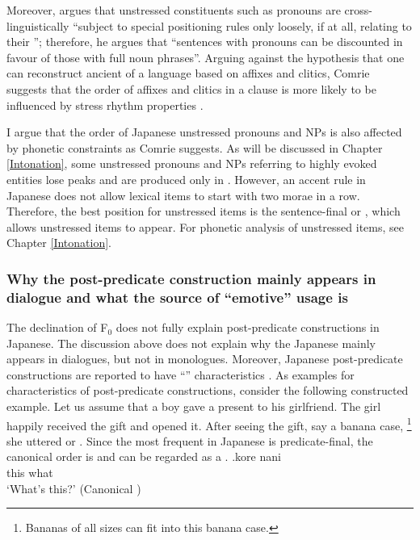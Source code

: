 Moreover,  argues that unstressed constituents such as  pronouns are cross-linguistically ``subject to special positioning rules only loosely, if at all, relating to their '';
therefore, he argues that ``sentences with pronouns can be discounted in favour of those with full noun phrases''.
Arguing against the hypothesis \cite{givon79}
that one can reconstruct ancient  of a language based on  affixes and clitics,
Comrie suggests that the order of  affixes and clitics in a clause is more likely to be influenced by stress rhythm properties \cite[][218]{comrie89}.

I argue that the order of Japanese unstressed pronouns and NPs is also affected by phonetic constraints as Comrie suggests.
As will be discussed in Chapter \ref{Intonation},
some unstressed pronouns and NPs referring to highly evoked entities
lose  peaks and are produced only in .
However, an accent rule in Japanese does not allow lexical items to start with two  morae in a row.
Therefore, the best position for unstressed items is the sentence-final or ,
which allows unstressed items to appear.
For phonetic analysis of unstressed items,
see Chapter \ref{Intonation}.


\subsubsection{Why the post-predicate construction mainly appears in dialogue and what the source of ``emotive'' usage is}

The declination of F$_{0}$ does not fully explain post-predicate constructions in Japanese.%
The discussion above does not explain why the Japanese  mainly appears in dialogues, but not in monologues.
Moreover, Japanese post-predicate constructions are reported to have ``'' characteristics \cite{ono07}.
As examples for  characteristics of post-predicate constructions, consider the following constructed example.
Let us assume that a boy gave a present to his girlfriend.
The girl happily received the gift and opened it.
After seeing the gift, say a banana case,%
	\footnote{
	Bananas of all sizes can fit into this banana case.
	}
she uttered \Next or \NNext.
Since the most frequent  in Japanese is predicate-final,
the canonical order is \Next and
\NNext can be regarded as a .
%
\exg.\label{korenani}kore nani \\
	this what \\
	`What's this?'
	\hfill{(Canonical )}

